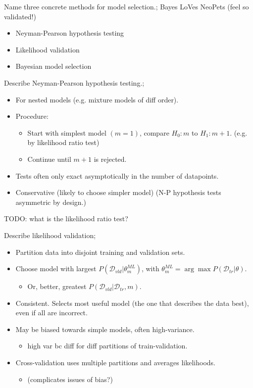 \documentclass{article}
\begin{document}
Name three concrete methods for model selection.; Bayes LoVes NeoPets (feel so validated!) \begin{itemize} \item Neyman-Pearson hypothesis testing \item Likelihood validation \item Bayesian model selection \end{itemize}

Describe Neyman-Pearson hypothesis testing.; \begin{itemize} \item For nested models (e.g. mixture models of diff order).  \item Procedure: \begin{itemize} \item Start with simplest model $(m=1)$, compare $H_0: m$ to $H_1: m+1$. (e.g. by likelihood ratio test) \item Continue until $m+1$ is rejected.  \end{itemize} \item Tests often only exact asymptotically in the number of datapoints.  \item Conservative (likely to choose simpler model) (N-P hypothesis tests asymmetric by design.) \end{itemize}

TODO: what is the likelihood ratio test?

Describe likelihood validation; \begin{itemize} \item Partition data into disjoint training and validation sets.  \item Choose model with largest $P(\mathcal{D}_{vld}|\theta_m^{ML})$, with $\theta_m^{ML}=\arg\max P(\mathcal{D}_{tr}|\theta)$.  \begin{itemize} \item Or, better, greatest $P(\mathcal{D}_{vld}|\mathcal{D}_{tr},m)$.  \end{itemize} \item Consistent. Selects most useful model (the one that describes the data best), even if all are incorrect.  \item May be biased towards simple models, often high-variance.  \begin{itemize} \item high var bc diff for diff partitions of train-validation.  \end{itemize} \item Cross-validation uses multiple partitions and averages likelihoods. \begin{itemize} \item (complicates issues of bias?) \end{itemize} \end{itemize}
\end{document}
